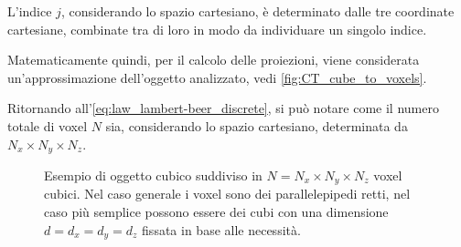 \documentclass[12pt,a4paper]{report}
\begin{document}
L'indice \(j\), considerando lo spazio cartesiano, è determinato dalle tre coordinate cartesiane, combinate tra di loro in modo da
individuare un singolo indice.

Matematicamente quindi, per il calcolo delle proiezioni, viene considerata un'approssimazione dell'oggetto analizzato, vedi
\autoref{fig:CT_cube_to_voxels}.

Ritornando all'\autoref{eq:law_lambert-beer_discrete}, si può notare come il numero totale di voxel \(N\) sia, considerando lo
spazio cartesiano, determinata da \(N_x \times N_y \times N_z\).

\begin{figure}[H]
  \centering
  \caption{\label{fig:CT_cube_to_voxels} Esempio di oggetto cubico suddiviso in \(N = N_x \times N_y \times N_z\) voxel cubici.
           Nel caso generale i voxel sono dei parallelepipedi retti, nel caso più semplice possono essere dei cubi con una
           dimensione \(d = d_x = d_y = d_z\) fissata in base alle necessità.}
\end{figure}
\end{document}
